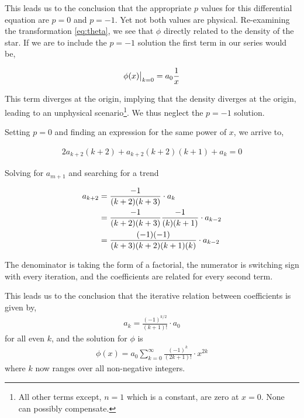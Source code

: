 \documentclass[12pt, manuscript]{article}
\begin{document}
\noindent This leads us to the conclusion that the appropriate $p$ values for this differential equation are $p=0$  and $p=-1$. Yet not both values are physical. Re-examining the transformation \eqref{eq:theta}, we see that $\phi$ directly related to the density of the star. If we are to include the $p=-1$ solution the first term in our series would be,

\begin{align}
\phi(x)\big|_{k=0}=a_{0}\frac{1}{x}\notag
\end{align}

\noindent This term diverges at the origin, implying that the density diverges at the origin, leading to an unphysical scenario\footnote{All other terms except, $n=1$ which is a constant, are zero at $x=0$. None can possibly compensate.}. We thus neglect the $p=-1$ solution.\par

\noindent Setting $p=0$ and finding an expression for the same power of $x$, we arrive to,
 
\begin{align}
2a_{k+2}(k+2)+a_{k+2}(k+2)(k+1)+a_{k}=0
\end{align}

\noindent Solving for $a_{m+1}$ and searching for a trend

\begin{align}
a_{k+2} &= \frac{-1}{(k+2)(k+3)}\cdot a_{k}\\
 &=\frac{-1}{(k+2)(k+3)}\frac{-1}{(k)(k+1)}\cdot a_{k-2}\notag\\
 &=\frac{(-1)( -1)}{(k+3)(k+2)(k+1)(k)}\cdot a_{k-2}\notag
\end{align}

\noindent The denominator is taking the form of a factorial, the numerator is switching sign with every iteration, and the coefficients are related for every second term. \par

\noindent This leads us to the conclusion that the iterative relation between coefficients is given by,
\begin{align}
a_{k} = \frac{(-1)^{k/2}}{(k+1)!}\cdot a_{0}
\end{align}
for all even $k$, and the solution for $\phi$ is
\begin{align}
\phi(x) = a_{0}\sum_{k=0}^{\infty}\frac{(-1)^{k}}{(2k+1)!}\cdot x^{2k}
\end{align}
\noindent where $k$ now ranges over all non-negative integers.
\end{document}
